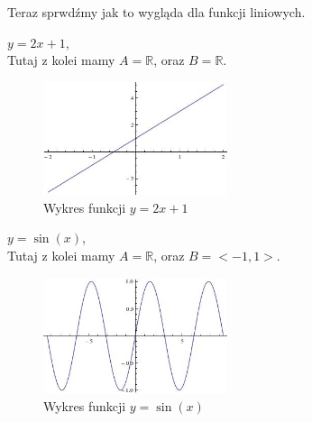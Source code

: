 Teraz sprwdźmy jak to wygląda dla funkcji liniowych.
\begin{przyklad}
$y=2x+1 $,
\\ Tutaj z kolei mamy $A=\mathbb{R} $, oraz $B = \mathbb{R}$.
\begin{figure}[H]
  \begin{center}
    \includegraphics[width=0.48\textwidth]{./podrozdzial01-obrazki/funkcja-liniowa.jpg}
  \end{center}
  \caption{Wykres funkcji $y=2x+1$}
\end{figure}


\end{przyklad}

\begin{przyklad}
$y=\sin(x) $,
\\ Tutaj z kolei mamy $A=\mathbb{R} $, oraz $B = <-1,1>$.
\begin{figure}[H]
  \begin{center}
    \includegraphics[width=0.48\textwidth]{./podrozdzial01-obrazki/funkcja-sinus.jpg}
  \end{center}
  \caption{Wykres funkcji $y=\sin(x)$}
\end{figure}
\end{przyklad}

